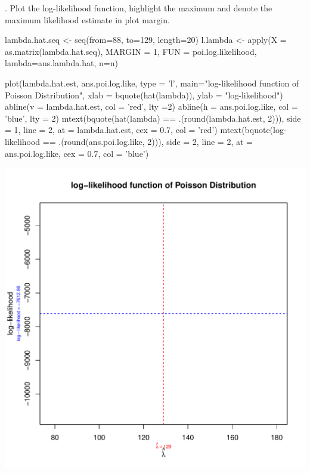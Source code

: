 \documentclass[12pt, oneside]{report}\usepackage[]{graphicx}\usepackage[]{color}
\makeatletter
\def\maxwidth{ %
  \ifdim\Gin@nat@width>\linewidth
    \linewidth
  \else
    \Gin@nat@width
  \fi
}
\makeatother
\begin{document}
. Plot the log-likelihood function, highlight the maximum and denote the maximum likelihood
estimate in plot margin.
\begin{Schunk}
\begin{Sinput}
lambda.hat.seq <- seq(from=88, to=129, length=20)
l.lambda <- apply(X = as.matrix(lambda.hat.seq), MARGIN = 1, FUN = poi.log.likelihood, lambda=ans.lambda.hat, n=n)

plot(lambda.hat.est, ans.poi.log.like, type = 'l', main="log-likelihood function of Poisson Distribution", xlab = bquote(hat(lambda)), ylab = "log-likelihood")
abline(v = lambda.hat.est, col = 'red', lty =2)
abline(h = ans.poi.log.like, col = 'blue', lty = 2)
mtext(bquote(hat(lambda) == .(round(lambda.hat.est, 2))), side = 1, line = 2,
      at = lambda.hat.est, cex = 0.7, col = 'red')
mtext(bquote(log-likelihood == .(round(ans.poi.log.like, 2))), side = 2, line = 2,
      at = ans.poi.log.like, cex = 0.7, col = 'blue')
\end{Sinput}

\includegraphics[width=\maxwidth]{figure/unnamed-chunk-3-1} \end{Schunk}
\end{document}
